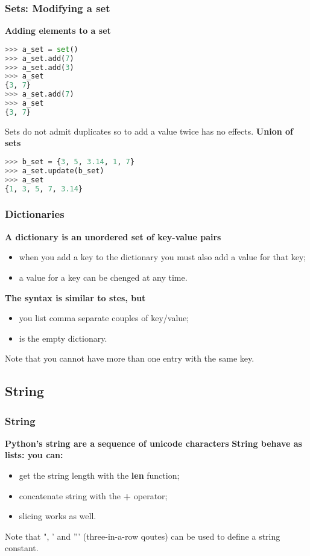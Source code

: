 \subsubsection{Sets: Modifying a set}
\textbf{Adding elements to a set}
\begin{lstlisting}[language=Python]
>>> a_set = set()
>>> a_set.add(7)
>>> a_set.add(3)
>>> a_set
{3, 7}
>>> a_set.add(7)
>>> a_set
{3, 7}
\end{lstlisting}
Sets do not admit duplicates so to add a value twice has no effects.
\textbf{Union of sets}
\begin{lstlisting}[language=Python]
>>> b_set = {3, 5, 3.14, 1, 7}
>>> a_set.update(b_set)
>>> a_set
{1, 3, 5, 7, 3.14}
\end{lstlisting}

\subsubsection{Dictionaries}
\textbf{A dictionary is an unordered set of key-value pairs}
\begin{itemize}
	\item when you add a key to the dictionary you must also add a value for that key;
	\item a value for a key can be chenged at any time.
\end{itemize}
\textbf{The syntax is similar to stes, but}
\begin{itemize}
	\item you list comma separate couples of key/value;
	\item {} is the empty dictionary.
\end{itemize}
Note that you cannot have more than one entry with the same key.

\subsection{String}
\subsubsection{String}
\textbf{Python's string are a sequence of unicode characters}
\textbf{String behave as lists: you can:}
\begin{itemize}
	\item get the string length with the \textbf{len} function;
	\item concatenate string with the \textbf{+} operator;
	\item slicing works as well.
\end{itemize}
Note that ", ' and ''' (three-in-a-row qoutes) can be used to define a string constant.

